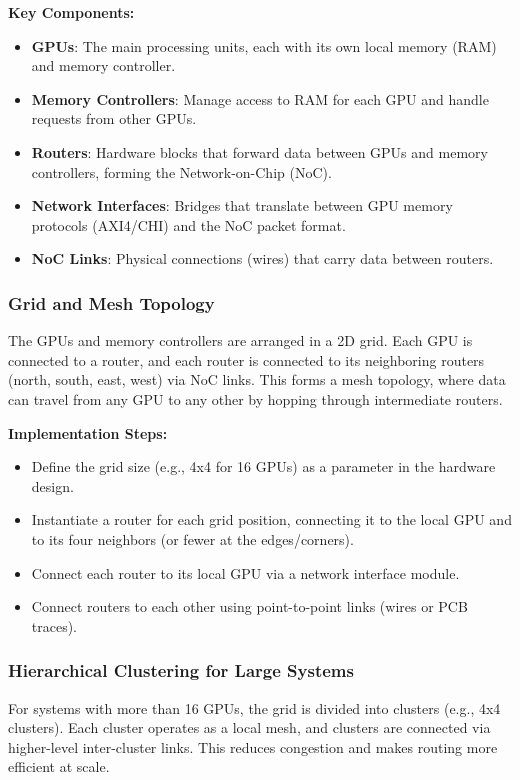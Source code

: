 \documentclass[11pt,a4paper]{article}
\begin{document}
\textbf{Key Components:}
\begin{itemize}
    \item \textbf{GPUs}: The main processing units, each with its own local memory (RAM) and memory controller.
    \item \textbf{Memory Controllers}: Manage access to RAM for each GPU and handle requests from other GPUs.
    \item \textbf{Routers}: Hardware blocks that forward data between GPUs and memory controllers, forming the Network-on-Chip (NoC).
    \item \textbf{Network Interfaces}: Bridges that translate between GPU memory protocols (AXI4/CHI) and the NoC packet format.
    \item \textbf{NoC Links}: Physical connections (wires) that carry data between routers.
\end{itemize}

\subsubsection{Grid and Mesh Topology}
The GPUs and memory controllers are arranged in a 2D grid. Each GPU is connected to a router, and each router is connected to its neighboring routers (north, south, east, west) via NoC links. This forms a mesh topology, where data can travel from any GPU to any other by hopping through intermediate routers.

\textbf{Implementation Steps:}
\begin{itemize}
    \item Define the grid size (e.g., 4x4 for 16 GPUs) as a parameter in the hardware design.
    \item Instantiate a router for each grid position, connecting it to the local GPU and to its four neighbors (or fewer at the edges/corners).
    \item Connect each router to its local GPU via a network interface module.
    \item Connect routers to each other using point-to-point links (wires or PCB traces).
\end{itemize}

\subsubsection{Hierarchical Clustering for Large Systems}
For systems with more than 16 GPUs, the grid is divided into clusters (e.g., 4x4 clusters). Each cluster operates as a local mesh, and clusters are connected via higher-level inter-cluster links. This reduces congestion and makes routing more efficient at scale.
\end{document}
